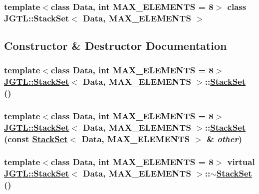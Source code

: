 \subsubsection*{template$<$class Data, int MAX\_\-ELEMENTS = 8$>$ class JGTL::Stack\-Set$<$ Data, MAX\_\-ELEMENTS $>$}



\subsection{Constructor \& Destructor Documentation}
\hypertarget{class_j_g_t_l_1_1_stack_set_842b6b0d43ade3636a6f5eb7cc29cfc5}{
\subsubsection[StackSet]{\setlength{\rightskip}{0pt plus 5cm}template$<$class Data, int MAX\_\-ELEMENTS = 8$>$ \hyperlink{class_j_g_t_l_1_1_stack_set}{JGTL::Stack\-Set}$<$ Data, MAX\_\-ELEMENTS $>$::\hyperlink{class_j_g_t_l_1_1_stack_set}{Stack\-Set} ()}}
\label{class_j_g_t_l_1_1_stack_set_842b6b0d43ade3636a6f5eb7cc29cfc5}


\hypertarget{class_j_g_t_l_1_1_stack_set_b2cc18e5b25781be9e000c3d206bfcbd}{
\subsubsection[StackSet]{\setlength{\rightskip}{0pt plus 5cm}template$<$class Data, int MAX\_\-ELEMENTS = 8$>$ \hyperlink{class_j_g_t_l_1_1_stack_set}{JGTL::Stack\-Set}$<$ Data, MAX\_\-ELEMENTS $>$::\hyperlink{class_j_g_t_l_1_1_stack_set}{Stack\-Set} (const \hyperlink{class_j_g_t_l_1_1_stack_set}{Stack\-Set}$<$ Data, MAX\_\-ELEMENTS $>$ \& {\em other})}}
\label{class_j_g_t_l_1_1_stack_set_b2cc18e5b25781be9e000c3d206bfcbd}


\hypertarget{class_j_g_t_l_1_1_stack_set_6494c9bbda6ab35af078faafaac7f02c}{
\subsubsection[$\sim$StackSet]{\setlength{\rightskip}{0pt plus 5cm}template$<$class Data, int MAX\_\-ELEMENTS = 8$>$ virtual \hyperlink{class_j_g_t_l_1_1_stack_set}{JGTL::Stack\-Set}$<$ Data, MAX\_\-ELEMENTS $>$::$\sim$\hyperlink{class_j_g_t_l_1_1_stack_set}{Stack\-Set} ()}}
\label{class_j_g_t_l_1_1_stack_set_6494c9bbda6ab35af078faafaac7f02c}




